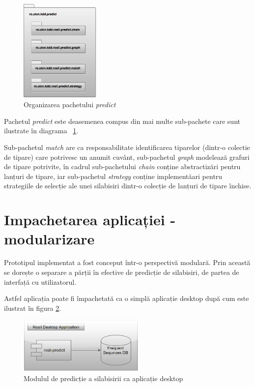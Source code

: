 \begin{figure}[h!]
    \centering
    \includegraphics[width=0.35\textwidth]{figures/rosil-predict-packages.png}
    \caption{Organizarea pachetului \textit{predict}}
    \label{fig:rosil-predict-packages}
\end{figure}

Pachetul \textit{predict} este deasemenea compus din mai multe sub-pachete care sunt ilustrate în diagrama ~\ref{fig:rosil-predict-packages}. 

Sub-pachetul \textit{match} are ca responsabilitate identificarea tiparelor (dintr-o colectie de tipare) care potrivesc un anumit cuvânt, sub-pachetul \textit{graph} modelează grafuri de tipare potrivite, în cadrul sub-pachetului \textit{chain} conține abstractizări pentru lanțuri de tipare, iar sub-pachetul \textit{strategy} conține implementăari pentru strategiile de selecție ale unei silabisiri dintr-o colecție de lanțuri de tipare închise. 

\section{Impachetarea aplicației - modularizare}

Prototipul implementat a fost conceput într-o perspectivă modulară. Prin această se dorește o separare a părții în efective de predicție de silabisiri, de partea de interfață cu utilizatorul. 

Astfel aplicația poate fi împachetată ca o simplă aplicație desktop după cum este ilustrat în figura \ref{fig:rosil-desktop}.

\begin{figure}[h!]
    \centering
    \includegraphics[width=0.55\textwidth]{figures/rosil-desktop.png}
    \caption{Modulul de predicție a silabisirii ca aplicație desktop}
    \label{fig:rosil-desktop}
\end{figure}

